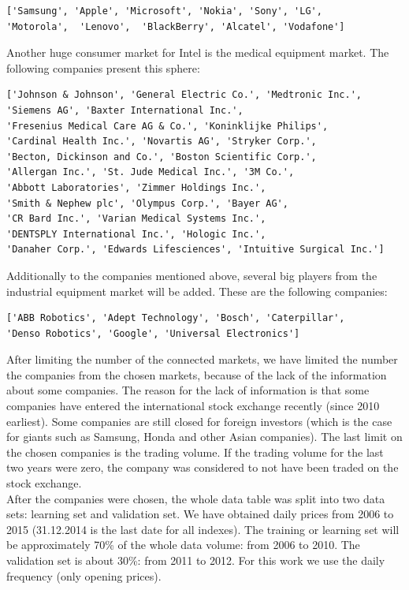 \documentclass[
  twoside,
  12pt, a4paper,
  footinclude=true,
  headinclude=true,
  cleardoublepage=empty
]{article}
\begin{document}
\begin{verbatim}
['Samsung', 'Apple', 'Microsoft', 'Nokia', 'Sony', 'LG',
'Motorola',  'Lenovo',  'BlackBerry', 'Alcatel', 'Vodafone']
\end{verbatim} 
Another huge consumer market for Intel is the medical equipment market. The following companies present this sphere:
\begin{verbatim}
['Johnson & Johnson', 'General Electric Co.', 'Medtronic Inc.',
'Siemens AG', 'Baxter International Inc.', 
'Fresenius Medical Care AG & Co.', 'Koninklijke Philips',
'Cardinal Health Inc.', 'Novartis AG', 'Stryker Corp.',
'Becton, Dickinson and Co.', 'Boston Scientific Corp.',
'Allergan Inc.', 'St. Jude Medical Inc.', '3M Co.',
'Abbott Laboratories', 'Zimmer Holdings Inc.', 
'Smith & Nephew plc', 'Olympus Corp.', 'Bayer AG',
'CR Bard Inc.', 'Varian Medical Systems Inc.',
'DENTSPLY International Inc.', 'Hologic Inc.', 
'Danaher Corp.', 'Edwards Lifesciences', 'Intuitive Surgical Inc.']
\end{verbatim}
Additionally to the companies mentioned above, several big players from the industrial equipment market will be added. These are the following companies:
\begin{verbatim} 
['ABB Robotics', 'Adept Technology', 'Bosch', 'Caterpillar',
'Denso Robotics', 'Google', 'Universal Electronics']
\end{verbatim}
After limiting the number of the connected markets, we have limited the number the companies from the chosen markets, because of the lack of the information about some companies. The reason for the lack of information is that some companies have entered the international stock exchange recently (since 2010 earliest). Some companies are still closed for foreign investors (which is the case for giants such as Samsung, Honda and other Asian companies). The last limit on the chosen companies is the trading volume. If  the trading volume for the last two years were zero, the company was considered to not have been traded on the stock exchange.\\
After the companies were chosen, the whole data table was split into two data sets: learning set and validation set. We have obtained daily prices from 2006 to 2015 (31.12.2014 is the last date for all indexes). The training or learning set will be approximately 70\% of the whole data volume: from 2006 to 2010. The validation set is about 30\%: from 2011 to 2012. For this work we use the daily frequency (only opening prices).\\
\end{document}
